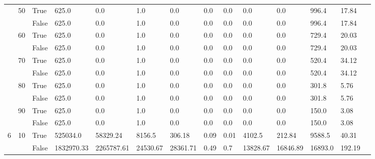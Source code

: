 \begin{appendices}
\begin{landscape}
\begin{small}
\begin{longtable}[c]{@{}lll|ll|ll|ll|ll|lll@{}}
   & 50 & True  & 625.0           & 0.0            & 1.0           & 0.0           & 0.0           & 0.0           & 0.0           & 0.0           & 996.4         & 17.84       &  \\
   &    & False & 625.0           & 0.0            & 1.0           & 0.0           & 0.0           & 0.0           & 0.0           & 0.0           & 996.4         & 17.84       &  \\
   & 60 & True  & 625.0           & 0.0            & 1.0           & 0.0           & 0.0           & 0.0           & 0.0           & 0.0           & 729.4         & 20.03       &  \\
   &    & False & 625.0           & 0.0            & 1.0           & 0.0           & 0.0           & 0.0           & 0.0           & 0.0           & 729.4         & 20.03       &  \\
   & 70 & True  & 625.0           & 0.0            & 1.0           & 0.0           & 0.0           & 0.0           & 0.0           & 0.0           & 520.4         & 34.12       &  \\
   &    & False & 625.0           & 0.0            & 1.0           & 0.0           & 0.0           & 0.0           & 0.0           & 0.0           & 520.4         & 34.12       &  \\
   & 80 & True  & 625.0           & 0.0            & 1.0           & 0.0           & 0.0           & 0.0           & 0.0           & 0.0           & 301.8         & 5.76        &  \\
   &    & False & 625.0           & 0.0            & 1.0           & 0.0           & 0.0           & 0.0           & 0.0           & 0.0           & 301.8         & 5.76        &  \\
   & 90 & True  & 625.0           & 0.0            & 1.0           & 0.0           & 0.0           & 0.0           & 0.0           & 0.0           & 150.0         & 3.08        &  \\
   &    & False & 625.0           & 0.0            & 1.0           & 0.0           & 0.0           & 0.0           & 0.0           & 0.0           & 150.0         & 3.08        &  \\
  \midrule
6  & 10 & True  & 525034.0        & 58329.24       & 8156.5        & 306.18        & 0.09          & 0.01          & 4102.5        & 212.84        & 9588.5        & 40.31       &  \\
   &    & False & 1832970.33      & 2265787.61     & 24530.67      & 28361.71      & 0.49          & 0.7           & 13828.67      & 16846.89      & 16893.0       & 192.19      &  \\

\end{longtable}
\end{small}
\end{landscape}
\end{appendices}
